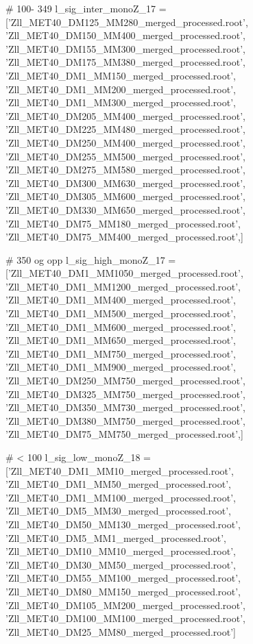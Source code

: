 # 100- 349
l_sig_inter_monoZ_17 = ['Zll_MET40_DM125_MM280_merged_processed.root',
'Zll_MET40_DM150_MM400_merged_processed.root',
'Zll_MET40_DM155_MM300_merged_processed.root',
'Zll_MET40_DM175_MM380_merged_processed.root',
'Zll_MET40_DM1_MM150_merged_processed.root',
'Zll_MET40_DM1_MM200_merged_processed.root',
'Zll_MET40_DM1_MM300_merged_processed.root',
'Zll_MET40_DM205_MM400_merged_processed.root',
'Zll_MET40_DM225_MM480_merged_processed.root',
'Zll_MET40_DM250_MM400_merged_processed.root',
'Zll_MET40_DM255_MM500_merged_processed.root',
'Zll_MET40_DM275_MM580_merged_processed.root',
'Zll_MET40_DM300_MM630_merged_processed.root',
'Zll_MET40_DM305_MM600_merged_processed.root',
'Zll_MET40_DM330_MM650_merged_processed.root',
'Zll_MET40_DM75_MM180_merged_processed.root',
'Zll_MET40_DM75_MM400_merged_processed.root',]

# 350 og opp
l_sig_high_monoZ_17 = ['Zll_MET40_DM1_MM1050_merged_processed.root',
'Zll_MET40_DM1_MM1200_merged_processed.root',
'Zll_MET40_DM1_MM400_merged_processed.root',
'Zll_MET40_DM1_MM500_merged_processed.root',
'Zll_MET40_DM1_MM600_merged_processed.root',
'Zll_MET40_DM1_MM650_merged_processed.root',
'Zll_MET40_DM1_MM750_merged_processed.root',
'Zll_MET40_DM1_MM900_merged_processed.root',
'Zll_MET40_DM250_MM750_merged_processed.root',
'Zll_MET40_DM325_MM750_merged_processed.root',
'Zll_MET40_DM350_MM730_merged_processed.root',
'Zll_MET40_DM380_MM750_merged_processed.root',
'Zll_MET40_DM75_MM750_merged_processed.root',]


# < 100
l_sig_low_monoZ_18 = ['Zll_MET40_DM1_MM10_merged_processed.root',
                   'Zll_MET40_DM1_MM50_merged_processed.root',
                   'Zll_MET40_DM1_MM100_merged_processed.root',
                   'Zll_MET40_DM5_MM30_merged_processed.root',
                   'Zll_MET40_DM50_MM130_merged_processed.root',
                   'Zll_MET40_DM5_MM1_merged_processed.root',
                   'Zll_MET40_DM10_MM10_merged_processed.root',
                   'Zll_MET40_DM30_MM50_merged_processed.root',
                   'Zll_MET40_DM55_MM100_merged_processed.root',
                   'Zll_MET40_DM80_MM150_merged_processed.root',
                   'Zll_MET40_DM105_MM200_merged_processed.root',
                   'Zll_MET40_DM100_MM100_merged_processed.root',
                   'Zll_MET40_DM25_MM80_merged_processed.root']




   
 


